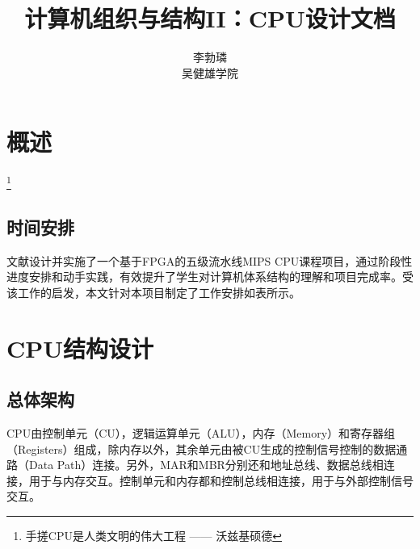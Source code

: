 \documentclass[lang=cn,a4paper,newtx]{elegantpaper}
\title{计算机组织与结构II：CPU设计文档}
\author{李勃璘 \\ 吴健雄学院}
\date{\zhdate{2025/4/14}}
\begin{document}
\maketitle
\thispagestyle{empty}
\begin{abstract}

\end{abstract}








\newpage
{}
\tableofcontents
\newpage
\listoftables
\newpage
{}
\section{概述}
\lipsum[5]\footnote{手搓CPU是人类文明的伟大工程 —— 沃兹基硕德}

\subsection{时间安排}
文献\cite{timeline}设计并实施了一个基于FPGA的五级流水线MIPS CPU课程项目，通过阶段性进度安排和动手实践，有效提升了学生对计算机体系结构的理解和项目完成率。受该工作的启发，本文针对本项目制定了工作安排如表所示。
\section{CPU结构设计}
\subsection{总体架构}
CPU由控制单元（CU），逻辑运算单元（ALU），内存（Memory）和寄存器组（Registers）组成，除内存以外，其余单元由被CU生成的控制信号控制的数据通路（Data Path）连接。另外，MAR和MBR分别还和地址总线、数据总线相连接，用于与内存交互。控制单元和内存都和控制总线相连接，用于与外部控制信号交互。
\end{document}
